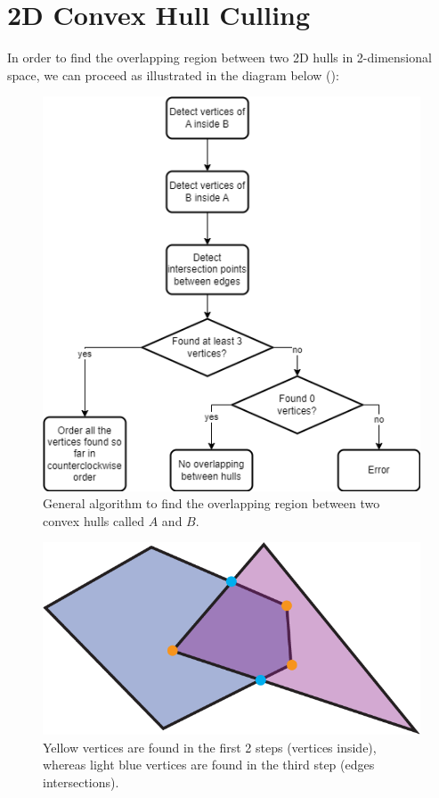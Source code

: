 \documentclass{PoliMi_MasterThesis}
\begin{document}
\section{2D Convex Hull Culling} \label{sec:2dHull_culling}
In order to find the overlapping region between two 2D hulls in 2-dimensional space, we can proceed as illustrated in the diagram below (\cite{convex_hull_culling}):

\begin{figure}[H]
    \centering
    \includegraphics[width=\textwidth*\real{0.75}]{Images/hull_culling.png} 
    \caption{General algorithm to find the overlapping region between two convex hulls called $A$ and $B$.}
    \label{fig:hull_culling}
\end{figure}

\begin{figure}[H]
    \centering
    \includegraphics[width=\textwidth*\real{0.45}]{Images/overlapping_hull.png} 
    \caption{Yellow vertices are found in the first 2 steps (vertices inside), whereas light blue vertices are found in the third step (edges intersections).}
    \label{fig:overlapping_hull}
\end{figure}
\end{document}
